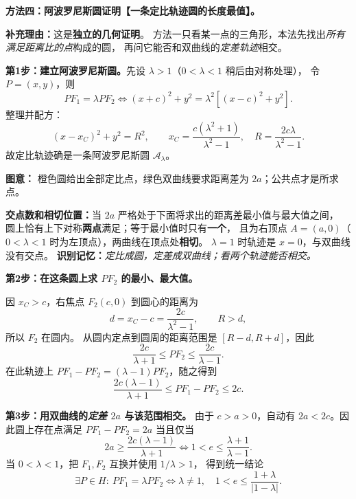\clearpage
\begin{proofbox}
\textbf{方法四：阿波罗尼斯圆证明【一条定比轨迹圆的长度最值】。}

\textbf{补充理由：}这是\textbf{独立的几何证明}。
方法一只看某一点的三角形，本法先找出\emph{所有满足距离比的点}构成的圆，
再问它能否和双曲线的\emph{定差轨迹}相交。

\textbf{第1步：建立阿波罗尼斯圆。}先设 $\lambda>1$（$0<\lambda<1$ 稍后由对称处理），
令 $P=(x,y)$，则
\[
PF_1=\lambda PF_2
\iff (x+c)^2+y^2=\lambda^2[(x-c)^2+y^2].
\]
整理并配方：
\[
\boxed{(x-x_C)^2+y^2=R^2},\qquad
x_C=\frac{c(\lambda^2+1)}{\lambda^2-1},\quad
R=\frac{2c\lambda}{\lambda^2-1}.
\]
故定比轨迹确是一条阿波罗尼斯圆 $\mathcal A_\lambda$。
\begin{center}\end{center}
\textbf{图意：} 橙色圆给出全部定比点，绿色双曲线要求距离差为 $2a$；公共点才是所求点。

\textbf{交点数和相切位置：}当 $2a$ 严格处于下面将求出的距离差最小值与最大值之间，
圆上恰有上下对称\textbf{两点}满足；等于最小值时只有\textbf{一个}，
且为右顶点 $A=(a,0)$（$0<\lambda<1$ 时为左顶点），两曲线在顶点处\textbf{相切}。
$\lambda=1$ 时轨迹是 $x=0$，与双曲线没有交点。
\textbf{识别记忆：}\emph{定比成圆，定差成双曲线；看两个轨迹能否相交。}

\tcbbreak
\textbf{第2步：在这条圆上求 $PF_2$ 的最小、最大值。}
\begin{center}\end{center}
因 $x_C>c$，右焦点 $F_2(c,0)$ 到圆心的距离为
\[
d=x_C-c=\frac{2c}{\lambda^2-1},\qquad R>d,
\]
所以 $F_2$ 在圆内。
从圆内定点到圆周的距离范围是 $[R-d,R+d]$，因此
\[
\boxed{\frac{2c}{\lambda+1}\le PF_2\le\frac{2c}{\lambda-1}}.
\]
在此轨迹上 $PF_1-PF_2=(\lambda-1)PF_2$，随之得到
\[
\boxed{\frac{2c(\lambda-1)}{\lambda+1}
\le PF_1-PF_2\le2c}.
\]

\textbf{第3步：用双曲线的\emph{定差} $2a$ 与该范围相交。}
由于 $c>a>0$，自动有 $2a<2c$。因此圆上存在点满足
$PF_1-PF_2=2a$ 当且仅当
\[
2a\ge\frac{2c(\lambda-1)}{\lambda+1}
\iff
\boxed{1<e\le\frac{\lambda+1}{\lambda-1}}.
\]
当 $0<\lambda<1$，把 $F_1,F_2$ 互换并使用 $1/\lambda>1$，
得到统一结论
\[
\boxed{\exists P\in H:\ PF_1=\lambda PF_2
\iff \lambda\ne1,\quad1<e\le\frac{1+\lambda}{|1-\lambda|}}.
\]

\end{proofbox}

